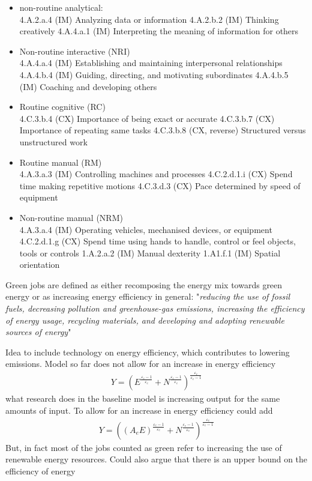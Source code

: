 \begin{itemize}
\begin{itemize}
	\item non-routine analytical: \\
	4.A.2.a.4 (IM) Analyzing data or information
	4.A.2.b.2 (IM) Thinking creatively
	4.A.4.a.1 (IM) Interpreting the meaning of information for others
	\item Non-routine interactive (NRI)
\\
	4.A.4.a.4 (IM) Establishing and maintaining interpersonal relationships
	4.A.4.b.4 (IM) Guiding, directing, and motivating subordinates
	4.A.4.b.5 (IM) Coaching and developing others
	\item Routine cognitive (RC)
\\
	4.C.3.b.4 (CX) Importance of being exact or accurate
	4.C.3.b.7 (CX) Importance of repeating same tasks
	4.C.3.b.8 (CX, reverse) Structured versus unstructured work
	\item Routine manual (RM)
\\
	4.A.3.a.3 (IM) Controlling machines and processes
	4.C.2.d.1.i (CX) Spend time making repetitive motions
	4.C.3.d.3 (CX) Pace determined by speed of equipment
	\item Non-routine manual (NRM)\\ 
	4.A.3.a.4 (IM) Operating vehicles, mechanised devices, or equipment
	4.C.2.d.1.g (CX) Spend time using hands to handle, control or feel objects, tools or controls
	1.A.2.a.2 (IM) Manual dexterity
	1.A1.f.1 (IM) Spatial orientation 
\end{itemize}
\end{itemize}

Green jobs are defined as either recomposing the energy mix towards green energy or as increasing energy efficiency in general: "\textit{reducing the use of fossil fuels, decreasing pollution and greenhouse-gas emissions, increasing the efficiency of energy usage, recycling materials, and developing and adopting renewable sources of energy}"

Idea to include technology on energy efficiency, which contributes to lowering emissions. 
Model so far does not allow for an increase in energy efficiency
\begin{align*}
Y=(E^{\frac{\varepsilon_e-1}{\varepsilon_e}}+N^{\frac{\varepsilon_e-1}{\varepsilon_e}})^\frac{\varepsilon_e}{\varepsilon_e-1}
\end{align*}
what research does in the baseline model is increasing output for the same amounts of input. To allow for an increase in energy efficiency could add
\begin{align*}
Y=((A_eE)^{\frac{\varepsilon_e-1}{\varepsilon_e}}+N^{\frac{\varepsilon_e-1}{\varepsilon_e}})^\frac{\varepsilon_e}{\varepsilon_e-1}
\end{align*}
But, in fact most of the jobs counted as green refer to increasing the use of renewable energy resources. Could also argue that there is an upper bound on the efficiency of energy
